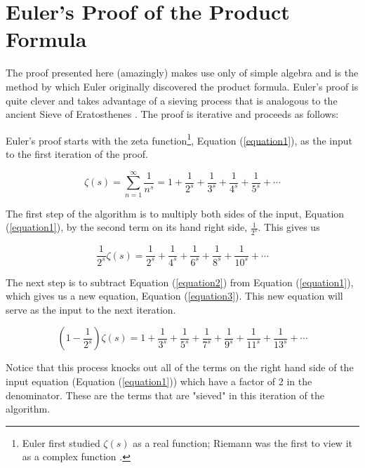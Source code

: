 \documentclass[11pt, oneside]{article}   	%
\begin{document}
\section{Euler's Proof of the Product Formula}
The proof presented here (amazingly) makes use only of simple
algebra and is the method by which Euler originally discovered
the product formula.  Euler's proof is quite clever and takes
advantage of a sieving process that is analogous to the ancient
Sieve of Eratosthenes \cite{wiki:sieve_of_eratosthenes}. The
proof is iterative and proceeds as follows:


\bigskip
\noindent
Euler's proof starts with the zeta function\footnote{Euler first
studied $\zeta(s)$ as a real function; Riemann was the first to
view it as a complex function \cite{nichols2016}.}, Equation
(\ref{equation1}), as the input to the first iteration of the
proof.

\bigskip
\begin{equation}
\zeta(s) = \sum _{n=1}^{\infty } \frac {1}{n^{s}} = 1 + \frac
{1}{2^{s}} + \frac {1}{3^{s}} + \frac{1}{4^s} + \frac{1}{5^s} +
\cdots     
\label{equation1}  
\end{equation}

\bigskip
\noindent
The first step of the algorithm is to multiply both sides of the
input, Equation (\ref{equation1}), by the second term on its hand
right side, $\frac{1}{2^s}$. This gives us

\bigskip
\begin{equation}
\frac {1}{2^{s}} \zeta (s) = \frac {1}{2^{s}} + \frac {1}{4^{s}}
+ \frac {1}{6^{s}} + \frac {1}{8^{s}} + \frac {1}{10^{s}} +
\cdots  
\label{equation2}
\end{equation}

\bigskip
\noindent
The next step is to subtract Equation (\ref{equation2}) from
Equation (\ref{equation1}), which gives us a new equation,
Equation (\ref{equation3}). This new equation will serve as the
input to the next iteration.

\bigskip
\begin{equation}
\left (1- \frac {1}{2^{s}} \right ) \zeta (s) = 1 + \frac
{1}{3^{s}} + \frac {1}{5^{s}} + \frac {1}{7^{s}} + \frac
{1}{9^{s}} + \frac {1}{11^{s}} + \frac {1}{13^{s}} + \cdots  
\label{equation3}
\end{equation}

\bigskip
\noindent
Notice that this process knocks out all of the terms on the right
hand side of the input equation (Equation (\ref{equation1}))
which have a factor of 2 in the denominator. These are the terms
that are "sieved" in this iteration of the algorithm.
\end{document}
